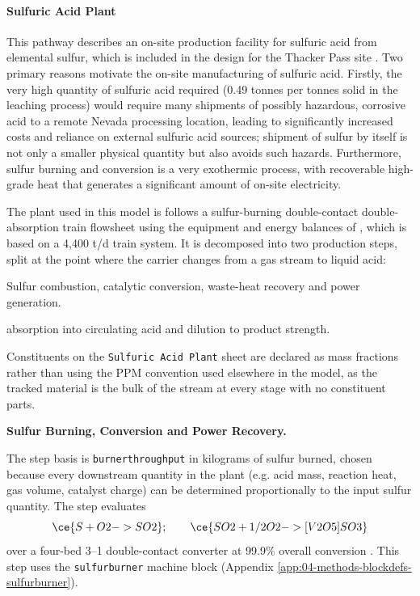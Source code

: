 \documentclass{article}
\renewcommand\_{\textunderscore\allowbreak}
\begin{document}
\paragraph{Sulfuric Acid Plant}\label{app:04-methods-facilitychoices-sap}\leavevmode\par

This pathway describes an on-site production facility for sulfuric acid from elemental sulfur, which is included in the design for the Thacker Pass site \citep{sgscanadaincSK1300Technical2024}. Two primary reasons motivate the on-site manufacturing of sulfuric acid. Firstly, the very high quantity of sulfuric acid required (0.49 tonnes per tonnes solid in the leaching process) would require many shipments of possibly hazardous, corrosive acid to a remote Nevada processing location, leading to significantly increased costs and reliance on external sulfuric acid sources; shipment of sulfur by itself is not only a smaller physical quantity but also avoids such hazards. Furthermore, sulfur burning and conversion is a very exothermic process, with recoverable high-grade heat that generates a significant amount of on-site electricity.

The plant used in this model is follows a sulfur-burning double-contact double-absorption train flowsheet using the equipment and energy balances of \citet{davenportSulfuricAcidManufacture2006}, which is based on a 4,400 t/d  train system. It is decomposed into two production steps, split at the point where the carrier changes from a gas stream to liquid acid:

\begin{description}[noitemsep, topsep=0pt]
    \item[\textbullet\enskip\texttt{Sulfur burning:}] Sulfur combustion, catalytic  conversion, waste-heat recovery and power generation.
    \item[\textbullet\enskip\texttt{Acid absorption:}]  absorption into circulating acid and dilution to product strength.
\end{description}

Constituents on the \texttt{Sulfuric Acid Plant} sheet are declared as mass fractions rather than using the PPM convention used elsewhere in the model, as the tracked material is the bulk of the stream at every stage with no constituent parts. 

\medskip
\noindent\textbf{Sulfur Burning, Conversion and Power Recovery.}\quad

The step basis is \texttt{burner\_throughput} in kilograms of sulfur burned, chosen because every downstream quantity in the plant (e.g. acid mass, reaction heat, gas volume, catalyst charge) can be determined proportionally to the input sulfur quantity. The step evaluates
\begin{equation}
    \ce{S + O2 -> SO2}; \qquad \ce{SO2 + 1/2 O2 ->[V2O5] SO3}
\end{equation}
over a four-bed 3--1 double-contact converter at 99.9\% overall conversion \cite{davenportSulfuricAcidManufacture2006}. This step uses the \texttt{sulfur\_burner} machine block (Appendix \ref{app:04-methods-blockdefs-sulfurburner}).
\end{document}
